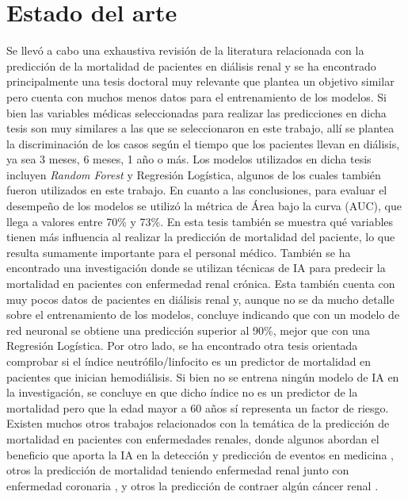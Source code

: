 
\section{Estado del arte}

Se llevó a cabo una exhaustiva revisión de la literatura relacionada con la predicción de la mortalidad de pacientes en diálisis renal y se ha encontrado principalmente una tesis doctoral \citep{ARTICULO3} muy relevante que plantea un objetivo similar pero cuenta con muchos menos datos para el entrenamiento de los modelos. Si bien las variables médicas seleccionadas para realizar las predicciones en dicha tesis son muy similares a las que se seleccionaron en este trabajo, allí se plantea la discriminación de los casos según el tiempo que los pacientes llevan en diálisis, ya sea 3 meses, 6 meses, 1 año o más. Los modelos utilizados en dicha tesis incluyen \textit{Random Forest} y Regresión Logística, algunos de los cuales también fueron utilizados en este trabajo.
En cuanto a las conclusiones, para evaluar el desempeño de los modelos se utilizó la métrica de Área bajo la curva (AUC), que llega a valores entre 70\% y 73\%.
En esta tesis también se muestra qué variables tienen más influencia al realizar la predicción de mortalidad del paciente, lo que resulta sumamente importante para el personal médico.
También se ha encontrado una investigación \citep{ARTICULO4} donde se utilizan técnicas de IA para predecir la mortalidad en pacientes con enfermedad renal crónica. Esta también cuenta con muy pocos datos de pacientes en diálisis renal y, aunque no se da mucho detalle sobre el entrenamiento de los modelos, concluye indicando que con un modelo de red neuronal se obtiene una predicción superior al 90\%, mejor que con una Regresión Logística.
Por otro lado, se ha encontrado otra tesis \citep{ARTICULO5} orientada comprobar si el índice neutrófilo/linfocito es un predictor de mortalidad en pacientes que inician hemodiálisis. Si bien no se entrena ningún modelo de IA en la investigación, se concluye en que dicho índice no es un predictor de la mortalidad pero que la edad mayor a 60 años sí representa un factor de riesgo. 
Existen muchos otros trabajos relacionados con la temática de la predicción de mortalidad en pacientes con enfermedades renales, donde algunos abordan el beneficio que aporta la IA en la detección y predicción de eventos en medicina \citep{ARTICULO6}\citep{ARTICULO7}\citep{ARTICULO9}, otros la predicción de mortalidad teniendo enfermedad renal junto con enfermedad coronaria \citep{ARTICULO10}, y otros la predicción de contraer algún cáncer renal \citep{ARTICULO8}.

